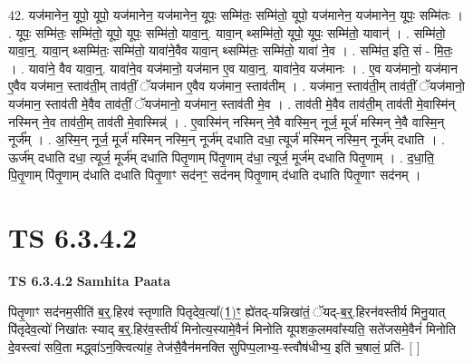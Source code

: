 \documentclass[17pt]{extarticle}
\begin{document}
42. यज॑मानेन॒ यूपो॒ यूपो॒ यज॑मानेन॒ यज॑मानेन॒ यूपः॒ सम्मि॑तः॒ सम्मि॑तो॒ यूपो॒ यज॑मानेन॒ यज॑मानेन॒ यूपः॒ सम्मि॑तः । . यूपः॒ सम्मि॑तः॒ सम्मि॑तो॒ यूपो॒ यूपः॒ सम्मि॑तो॒ यावा॒न्॒. यावा॒न् थ्सम्मि॑तो॒ यूपो॒ यूपः॒ सम्मि॑तो॒ यावान्॑ । . सम्मि॑तो॒ यावा॒न्॒. यावा॒न् थ्सम्मि॑तः॒ सम्मि॑तो॒ यावा॑ने॒वैव यावा॒न् थ्सम्मि॑तः॒ सम्मि॑तो॒ यावा॑ ने॒व । . सम्मि॑त॒ इति॒ सं - मि॒तः॒ । . यावा॑ने॒ वैव यावा॒न्॒. यावा॑ने॒व यज॑मानो॒ यज॑मान ए॒व यावा॒न्॒. यावा॑ने॒व यज॑मानः । . ए॒व यज॑मानो॒ यज॑मान ए॒वैव यज॑मान॒ स्ताव॑ती॒म् ताव॑तीं॒ ॅयज॑मान ए॒वैव यज॑मान॒ स्ताव॑तीम् । . यज॑मान॒ स्ताव॑ती॒म् ताव॑तीं॒ ॅयज॑मानो॒ यज॑मान॒ स्ताव॑ती मे॒वैव ताव॑तीं॒ ॅयज॑मानो॒ यज॑मान॒ स्ताव॑ती मे॒व । . ताव॑ती मे॒वैव ताव॑ती॒म् ताव॑ती मे॒वास्मि॑न् नस्मिन् ने॒व ताव॑ती॒म् ताव॑ती मे॒वास्मिन्न्॑ । . ए॒वास्मि॑न् नस्मिन् ने॒वै वास्मि॒न् नूर्ज॒ मूर्ज॑ मस्मिन् ने॒वै वास्मि॒न् नूर्ज᳚म् । . अ॒स्मि॒न् नूर्ज॒ मूर्ज॑ मस्मिन् नस्मि॒न् नूर्ज॑म् दधाति दधा॒ त्यूर्ज॑ मस्मिन् नस्मि॒न् नूर्ज॑म् दधाति । . ऊर्ज॑म् दधाति दधा॒ त्यूर्ज॒ मूर्ज॑म् दधाति पितृ॒णाम् पि॑तृ॒णाम् द॑धा॒ त्यूर्ज॒ मूर्ज॑म् दधाति पितृ॒णाम् । . द॒धा॒ति॒ पि॒तृ॒णाम् पि॑तृ॒णाम् द॑धाति दधाति पितृ॒णाꣳ सद॑नꣳ॒॒ सद॑नम् पितृ॒णाम् द॑धाति दधाति पितृ॒णाꣳ सद॑नम् । \newline
\pagebreak
{}

\section{ TS 6.3.4.2 }

\textbf{TS 6.3.4.2 } \newline
\textbf{Samhita Paata} \newline

पितृ॒णाꣳ सद॑नम॒सीति॑ ब॒र्॒.हिरव॑ स्तृणाति पितृदेव॒त्या᳚(1॒)ꣳ॒ ह्ये॑तद्-यन्निखा॑तं॒ ॅयद्-ब॒र्॒.हिरन॑वस्तीर्य मिनु॒यात् पि॑तृदेव॒त्यो॑ निखा॑तः स्याद् ब॒र्॒.हिर॑व॒स्तीर्य॑ मिनोत्य॒स्यामे॒वैनं॑ मिनोति यूपशक॒लमवा᳚स्यति॒ सते॑जसमे॒वैनं॑ मिनोति दे॒वस्त्वा॑ सवि॒ता मद्ध्वा॑ऽन॒क्त्वित्या॑ह॒ तेज॑सै॒वैन॑मनक्ति सुपिप्प॒लाभ्य॒-स्त्वौष॑धीभ्य॒ इति॑ च॒षालं॒ प्रति॑- [  ] \newline
\end{document}
